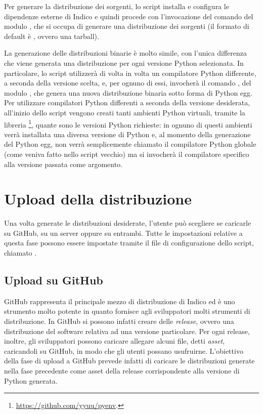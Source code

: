         Per generare la distribuzione dei sorgenti, lo script installa e configura le dipendenze esterne di Indico e quindi procede con l'invocazione del comando  del modulo  \cite{python:sdist}, che si occupa di generare una distribuzione dei sorgenti (il formato di default è , ovvero una tarball).
        
        La generazione delle distribuzioni binarie è molto simile, con l'unica differenza che viene generata una distribuzione per ogni versione Python selezionata. In particolare, lo script utilizzerà di volta in volta un compilatore Python differente, a seconda della versione scelta, e, per ognuno di essi, invocherà il comando , del modulo  \cite{python:bdist}, che genera una nuova distribuzione binaria sotto forma di Python egg. Per utilizzare compilatori Python differenti a seconda della versione desiderata, all'inizio dello script vengono creati tanti ambienti Python virtuali, tramite la libreria \footnote{\url{https://github.com/yyuu/pyenv}.}, quante sono le versioni Python richieste: in ognuno di questi ambienti verrà installata una diversa versione di Python e, al momento della generazione del Python egg, non verrà semplicemente chiamato il compilatore Python globale (come veniva fatto nello script vecchio) ma si invocherà il compilatore specifico alla versione passata come argomento.
    
    \section{Upload della distribuzione} \label{sec:dp;upload_distribuzione}
    
        Una volta generate le distribuzioni desiderate, l'utente può scegliere se caricarle su GitHub, su un server oppure su entrambi. Tutte le impostazioni relative a questa fase possono essere impostate tramite il file di configurazione dello script, chiamato .
        
        \subsection{Upload su GitHub} \label{subsec:dp;ud;upload_github}
        
            GitHub rappresenta il principale mezzo di distribuzione di Indico ed è uno strumento molto potente in quanto fornisce agli sviluppatori molti strumenti di distribuzione. In GitHub si possono infatti creare delle \textit{release}, ovvero una distribuzione del software relativa ad una versione particolare. Per ogni release, inoltre, gli sviluppatori possono caricare allegare alcuni file, detti \textit{asset}, caricandoli su GitHub, in modo che gli utenti possano usufruirne. L'obiettivo della fase di upload a GitHub prevede infatti di caricare le distribuzioni generate nella fase precedente come asset della release corrispondente alla versione di Python generata.
            
